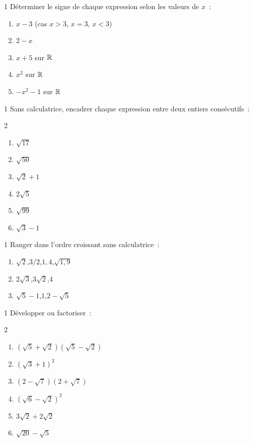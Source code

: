 \begin{exo}{1}
D\'eterminer le signe de chaque expression selon les valeurs de $x$~:
\begin{enumerate}
  \item $x - 3$ \quad (cas $x > 3$, $x = 3$, $x < 3$)
  \item $2 - x$
  \item $x + 5$ sur $\mathbb{R}$
  \item $x^2$ sur $\mathbb{R}$
  \item $-x^2 - 1$ sur $\mathbb{R}$
\end{enumerate}
\end{exo}

\begin{exo}{1}
Sans calculatrice, encadrer chaque expression entre deux entiers cons\'ecutifs~:
\begin{multicols}{2}
\begin{enumerate}
  \item $\sqrt{17}$
  \item $\sqrt{50}$
  \item $\sqrt{2}+1$
  \item $2\sqrt{5}$
  \item $\sqrt{99}$
  \item $\sqrt{3}-1$
\end{enumerate}
\end{multicols}
\end{exo}

\begin{exo}{1}
Ranger dans l'ordre croissant sans calculatrice~:
\begin{enumerate}
  \item $\sqrt{2}$,\quad $3/2$,\quad $1{,}4$,\quad $\sqrt{1{,}9}$
  \item $2\sqrt{3}$,\quad $3\sqrt{2}$,\quad $4$
  \item $\sqrt{5}-1$,\quad $1$,\quad $2-\sqrt{5}$
\end{enumerate}
\end{exo}

\begin{exo}{1}
D\'evelopper ou factoriser~:
\begin{multicols}{2}
\begin{enumerate}
  \item $(\sqrt{5}+\sqrt{2})(\sqrt{5}-\sqrt{2})$
  \item $(\sqrt{3}+1)^2$
  \item $(2-\sqrt{7})(2+\sqrt{7})$
  \item $(\sqrt{6}-\sqrt{2})^2$
  \item $3\sqrt{2}+2\sqrt{2}$
  \item $\sqrt{20}-\sqrt{5}$
\end{enumerate}
\end{multicols}
\end{exo}


